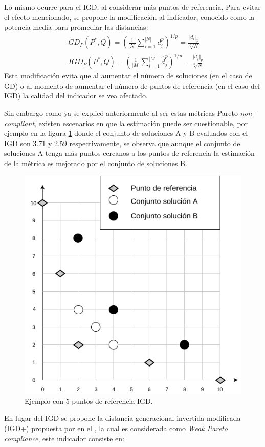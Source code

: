 Lo mismo ocurre para el IGD, al considerar más puntos de referencia.
%
Para evitar el efecto mencionado, se propone la modificación al indicador, conocido como la potencia media para promediar las distancias:
\begin{equation}
\begin{split}
& GD_P(P^*, Q) = \left( \frac{1}{|N|}  \sum_{i=1}^{|N|} d_i^p  \right) ^{1/p} = \frac{ \Vert d_i \Vert_p }{\sqrt[p]{N}}  \\
& IGD_P(P^*, Q) = \left( \frac{1}{|M|}  \sum_{i=1}^{|M|} \hat{d}_j^p  \right) ^{1/p} = \frac{ \Vert \hat{d}_j \Vert_p }{\sqrt[p]{N}}  
\end{split}
\end{equation}
%
Esta modificación evita que al aumentar el número de soluciones (en el caso de GD) o al momento de aumentar el número de puntos de referencia (en el caso del IGD) la calidad del indicador se vea afectado.
%

%
Sin embargo como ya se explicó anteriormente al ser estas métricas Pareto \textit{non-compliant}, existen escenarios en que la estimación puede ser cuestionable, por ejemplo en la figura \ref{fig:IGD_Fallo} donde el conjunto de soluciones A y B evaluados con el IGD son 3.71 y 2.59 respectivamente, se observa que aunque el conjunto de soluciones A tenga más puntos cercanos a los  puntos de referencia la estimación de la métrica es mejorado por el conjunto de soluciones B.

\begin{figure}[H]
\centering
\scriptsize
\includegraphics[scale=0.2]
{Figures_Chapter2/IGD_Problema.png}
\decoRule
\caption{Ejemplo con 5 puntos de referencia IGD.}
\label{fig:IGD_Fallo}
\end{figure}
%
En lugar del IGD se propone la distancia generacional invertida modificada (IGD+) propuesta por \citeauthor{Joel:IGDPlus_And_GDPlus} en el \citeyear{Joel:IGDPlus_And_GDPlus}, la cual es considerada como \textit{Weak Pareto compliance}, este indicador consiste en:


